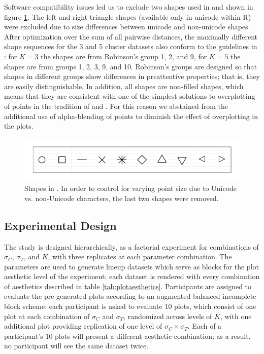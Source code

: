 \documentclass[11pt]{isuthesis}\usepackage[]{graphicx}\usepackage[]{color}
\newenvironment{knitrout}{}{} %
\begin{document}
Software compatibility issues led us to exclude two shapes used in \citet{heer:2014} and shown in figure \ref{fig:shapes}. The left and right triangle shapes (available only in unicode within R) were excluded due to size differences between unicode and non-unicode shapes. After optimization over the sum of all pairwise distances, the maximally different shape sequences for the 3 and 5 cluster datasets also conform to the guidelines in \citet{robinson:03}: for $K=3$ the shapes are from Robinson's group 1, 2, and 9, for $K=5$ the shapes are from groups 1, 2, 3, 9, and 10. Robinson's groups are designed so that shapes in different groups show differences in preattentive properties; that is, they are easily distinguishable. In addition, all shapes are non-filled shapes, which means that they are consistent with one of the simplest solutions to overplotting of points in the tradition of \citet{eda, cleveland:85} and \citet{few}. For this reason we abstained from the additional use of alpha-blending of points to diminish the effect of overplotting in the plots.

\begin{figure}[ht]\centering
\begin{knitrout}
\color{fgcolor}

{\centering \includegraphics[width=.5\linewidth]{Figure/FeatureHierarchy/fig-shape-palette-1} 

}



\end{knitrout}
\caption[Shape palette used to maximize preattentive perception]{Shapes in \citet{heer:2014}. In order to control for varying point size due to Unicode vs. non-Unicode characters, the last two shapes were removed.\label{fig:shapes}}
\end{figure}

\subsection{Experimental Design}
The study is designed hierarchically, as a factorial experiment for combinations of $\sigma_C$, $\sigma_T$, and $K$, with three replicates at each parameter combination. The parameters are used to generate lineup datasets which serve as blocks for the plot aesthetic level of the experiment; each dataset is rendered with every combination of aesthetics described in table \ref{tab:plotaesthetics}. Participants are assigned to evaluate the pre-generated plots according to an augmented balanced incomplete block scheme: each participant is asked to evaluate 10 plots, which consist of one plot at each combination of $\sigma_C$ and $\sigma_T$, randomized across levels of $K$, with one additional plot providing replication of one level of $\sigma_C\times\sigma_T$. Each of a participant's 10 plots will present a different aesthetic combination; as a result, no participant will see the same dataset twice.
\end{document}

